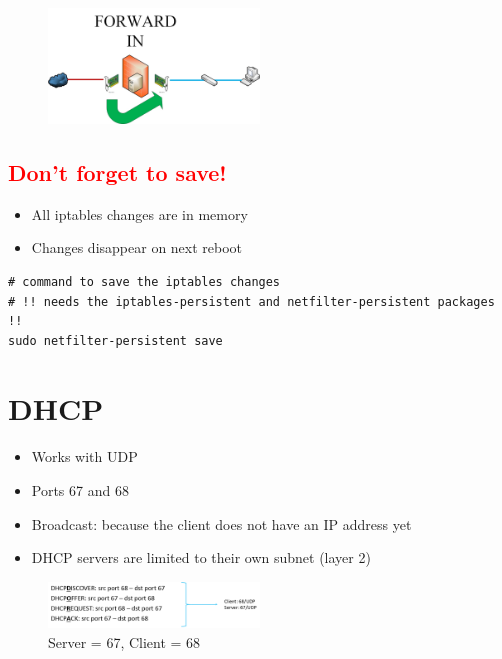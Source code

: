 \documentclass{article}
\begin{document}
\begin{figure}[H]
    \centering
    \includegraphics[width=0.5\textwidth]{forward-in-chain.jpg}
\end{figure}


\subsection{\textcolor{red}{Don't forget to save!}}

\begin{itemize}
    \item All iptables changes are in memory
    \item Changes disappear on next reboot
\end{itemize}

\begin{verbatim}
# command to save the iptables changes
# !! needs the iptables-persistent and netfilter-persistent packages !!
sudo netfilter-persistent save
\end{verbatim}

\section{DHCP}

\begin{itemize}
    \item Works with UDP
    \item Ports 67 and 68
    \item Broadcast: because the client does not have an IP address yet
    \item DHCP servers are limited to their own subnet (layer 2)
\end{itemize}

\begin{figure}[H]
    \centering
    \includegraphics[width=0.5\textwidth]{dhcp-dora.png}
    \caption{Server = 67, Client = 68}
\end{figure}
\end{document}
